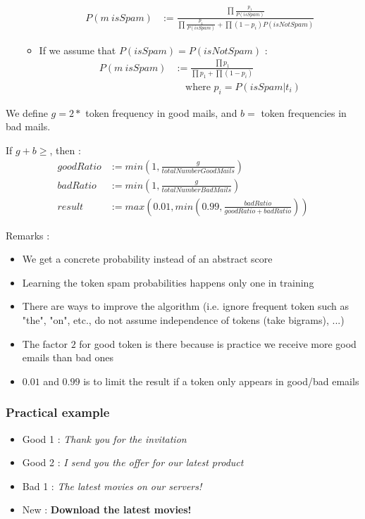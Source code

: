\begin{enumerate}
\begin{itemize}
        \begin{align*}
        P(m\ isSpam) &:= \frac{\prod \frac{p_1}{P(isSpam)}}{\prod \frac{p_1}{P(isSpam)} + \prod(1-p_i)P(isNotSpam)}
        \end{align*}
        \item If we assume that $P(isSpam) = P(isNotSpam)$ :
        \begin{align*}
        P(m\ isSpam) &:= \frac{\prod p_1}{\prod p_1 + \prod(1-p_i)}\\
                     &\ \ \ \ \ \text{where }p_i = P(isSpam | t_i)
        \end{align*}
    \end{itemize}
\end{enumerate}

We define $g = 2 * $ token frequency in good mails, and $b = $ token frequencies in bad mails. 

If $g + b \geq $, then :
\begin{align*}
goodRatio &:= min(1, \frac{g}{totalNumberGoodMails})\\
badRatio &:= min(1, \frac{g}{totalNumberBadMails})\\
result &:= max(0.01, min (0.99, \frac{badRatio}{goodRatio + badRatio}))
\end{align*}

Remarks :
\begin{itemize}
    \item We get a concrete probability instead of an abstract score
    \item Learning the token spam probabilities happens only one in training
    \item There are ways to improve the algorithm (i.e. ignore frequent token such as "the", "on", etc., do not assume independence of tokens (take bigrams), ...)
    \item The factor $2$ for good token is there because is practice we receive more good emails than bad ones
    \item $0.01$ and $0.99$ is to limit the result if a token only appears in good/bad emails
\end{itemize}

\subsubsection{Practical example}

\begin{itemize}
    \item Good 1 : \textit{Thank you for the invitation}
    \item Good 2 : \textit{I send you the offer for our latest product}
    \item Bad 1 : \textit{The latest movies on our servers!}
    \item New : \textbf{Download the latest movies!}
\end{itemize}

